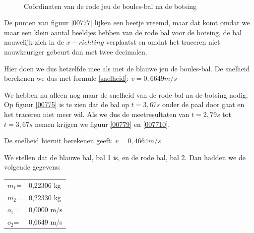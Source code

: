 \documentclass[12pt,a4paper]{article}
\begin{document}
	\begin{figure}[H]
		\centering
		\,
		\caption{Co\"{o}rdinaten van de rode jeu de boules-bal na de botsing}
	\end{figure}
	
	De punten van figuur \eqref{00777} lijken een beetje vreemd, maar dat komt omdat we maar een klein aantal beeldjes hebben van de rode bal voor de botsing, de bal nauwelijk zich in de $x-richting$ verplaatst en omdat het traceren niet nauwkeuriger gebeurt dan met twee decimalen.

	Hier doen we dus hetzelfde mee als met de blauwe jeu de boules-bal. De snelheid berekenen we dus met formule \eqref{snelheid}: $v=0,6649m/s$

	We hebben nu alleen nog maar de snelheid van de rode bal na de botsing nodig. Op figuur \ref{00775} is te zien dat de bal op $t=3,67s$ onder de paal door gaat en het traceren niet meer wil. Als we dus de meetresultaten van $t=2,79s$ tot $t=3,67s$ nemen krijgen we figuur \ref{00779} en \ref{007710}.

	De snelheid hieruit berekenen geeft: $v=0,4664m/s$

	We stellen dat de blauwe bal, bal 1 is, en de rode bal, bal 2.
	Dan hadden we de volgende gegevens:

	\begin{tabular}{  l l }
		$m_1$= &0,22306 kg\\
		$m_2$= &0,22330 kg\\
		$o_1$= &0,0000 m/s\\
		$o_2$= &0,6649 m/s\\
	\end{tabular}
\end{document}

